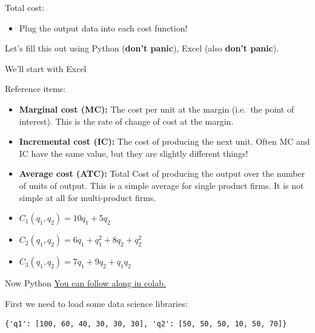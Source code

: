 \documentclass[
  ignorenonframetext,
]{beamer}
\providecommand{\tightlist}{%
  \setlength{\itemsep}{0pt}\setlength{\parskip}{0pt}}\usepackage{longtable,booktabs,array}
\begin{document}
\begin{frame}{Total cost:}
\label{total-cost}
\begin{itemize}
\tightlist
\item
  Plug the output data into each cost function!
\end{itemize}

\pause

Let's fill this out using Python (\textbf{don't panic}), Excel (also
\textbf{don't panic}).

We'll start with Excel
\end{frame}

\begin{frame}
\begin{block}{Reference items:}
\label{reference-items}
\begin{itemize}
\tightlist
\item
  \textbf{Marginal cost (MC):} The cost per unit at the margin (i.e.~the
  point of interest). This is the rate of change of cost at the margin.
\item
  \textbf{Incremental cost (IC):} The cost of producing the next unit.
  Often MC and IC have the same value, but they are slightly different
  things!
\item
  \textbf{Average cost (ATC):} Total Cost of producing the output over
  the number of units of output. This is a simple average for single
  product firms. It is not simple at all for multi-product firms.
\item
  \(C_1(q_1, q_2) = 10q_1 + 5q_2\)
\item
  \(C_2(q_1, q_2) = 6q_1 + q_1^2 + 8q_2 + q_2^2\)
\item
  \(C_3(q_1, q_2) = 7q_1 + 9q_2 + q_1q_2\)
\end{itemize}
\end{block}
\end{frame}

\begin{frame}[fragile]
\begin{block}{Now Python}
\label{now-python}
\href{https://colab.google}{You can follow along in colab.}

First we need to load some data science libraries:

\pause

\pause

\begin{verbatim}
{'q1': [100, 60, 40, 30, 30, 30], 'q2': [50, 50, 50, 10, 50, 70]}
\end{verbatim}
\end{block}
\end{frame}
\end{document}
